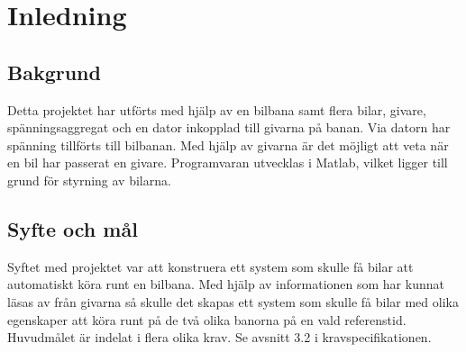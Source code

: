 \section{Inledning}

\subsection{Bakgrund} Detta projektet har utförts med hjälp av en bilbana samt
flera bilar, givare, spänningsaggregat och en dator inkopplad till givarna på
banan. Via datorn har spänning tillförts till bilbanan. Med hjälp av givarna är
det möjligt att veta när en bil har passerat en givare.  Programvaran utvecklas
i Matlab, vilket ligger till grund för styrning av bilarna.

\subsection{Syfte och mål}

Syftet med projektet var att konstruera ett system som skulle få bilar att
automatiskt köra runt en bilbana.
Med hjälp av informationen som har kunnat läsas av från givarna så skulle det
skapas ett system som skulle få bilar med olika egenskaper att köra runt på de
två olika banorna på en vald referenstid. Huvudmålet är indelat i flera olika
krav.  Se avsnitt 3.2 i kravspecifikationen.
